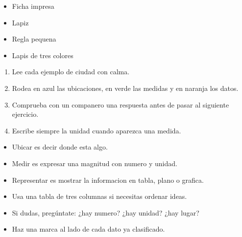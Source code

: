 \documentclass[12pt,a4paper]{article}
\begin{document}
        \FichaCabecera

        \begin{materialesbox}
        \begin{itemize}
    \item Ficha impresa
    \item Lapiz
    \item Regla pequena
    \item Lapis de tres colores
\end{itemize}
        \end{materialesbox}

        \begin{pasosbox}
        \begin{enumerate}
    \item Lee cada ejemplo de ciudad con calma.
    \item Rodea en azul las ubicaciones, en verde las medidas y en naranja los datos.
    \item Comprueba con un companero una respuesta antes de pasar al siguiente ejercicio.
    \item Escribe siempre la unidad cuando aparezca una medida.
\end{enumerate}
        \end{pasosbox}

        \begin{recordatoriobox}
        \begin{itemize}
    \item Ubicar es decir donde esta algo.
    \item Medir es expresar una magnitud con numero y unidad.
    \item Representar es mostrar la informacion en tabla, plano o grafica.
\end{itemize}
        \end{recordatoriobox}

        \begin{apoyobox}
        \begin{itemize}
    \item Usa una tabla de tres columnas si necesitas ordenar ideas.
    \item Si dudas, pregúntate: ¿hay numero? ¿hay unidad? ¿hay lugar?
    \item Haz una marca al lado de cada dato ya clasificado.
\end{itemize}
        \end{apoyobox}

\end{document}
